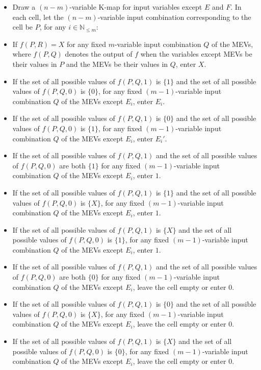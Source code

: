 \documentclass[a4paper,12pt]{article}
\begin{document}
\begin{itemize}
\begin{itemize}
\begin{itemize}
\begin{itemize}
\begin{itemize}
\begin{itemize}
\begin{itemize}
\ben
\item Draw a $(n-m)$-variable K-map for input variables except $E$ and $F$. In each cell, let the $(n-m)$-variable input combination corresponding to the cell be $P$, for any $i\in\mathbb{N}_{\leq m}$:
\bit
\item If $f(P,R)=X$ for any fixed $m$-variable input combination $Q$ of the MEVs, where $f(P,Q)$ denotes the output of $f$ when the variables except MEVs be their values in $P$ and the MEVs be their values in $Q$, enter $X$.
\item If the set of all possible values of $f(P,Q,1)$ is $\{1\}$ and the set of all possible values of $f(P,Q,0)$ is $\{0\}$, for any fixed $(m-1)$-variable input combination $Q$ of the MEVs except $E_i$, enter $E_i$.
\item If the set of all possible values of $f(P,Q,1)$ is $\{0\}$ and the set of all possible values of $f(P,Q,0)$ is $\{1\}$, for any fixed $(m-1)$-variable input combination $Q$ of the MEVs except $E_i$, enter $E_i'$.
\item If the set of all possible values of $f(P,Q,1)$ and the set of all possible values of $f(P,Q,0)$ are both $\{1\}$ for any fixed $(m-1)$-variable input combination $Q$ of the MEVs except $E_i$, enter $1$.
\item If the set of all possible values of $f(P,Q,1)$ is $\{1\}$ and the set of all possible values of $f(P,Q,0)$ is $\{X\}$, for any fixed $(m-1)$-variable input combination $Q$ of the MEVs except $E_i$, enter $1$.
\item If the set of all possible values of $f(P,Q,1)$ is $\{X\}$ and the set of all possible values of $f(P,Q,0)$ is $\{1\}$, for any fixed $(m-1)$-variable input combination $Q$ of the MEVs except $E_i$, enter $1$.
\item If the set of all possible values of $f(P,Q,1)$ and the set of all possible values of $f(P,Q,0)$ are both $\{0\}$ for any fixed $(m-1)$-variable input combination $Q$ of the MEVs except $E_i$, leave the cell empty or enter $0$.
\item If the set of all possible values of $f(P,Q,1)$ is $\{0\}$ and the set of all possible values of $f(P,Q,0)$ is $\{X\}$, for any fixed $(m-1)$-variable input combination $Q$ of the MEVs except $E_i$, leave the cell empty or enter $0$.
\item If the set of all possible values of $f(P,Q,1)$ is $\{X\}$ and the set of all possible values of $f(P,Q,0)$ is $\{0\}$, for any fixed $(m-1)$-variable input combination $Q$ of the MEVs except $E_i$, leave the cell empty or enter $0$.

\end{itemize}
\end{itemize}
\end{itemize}
\end{itemize}
\end{itemize}
\end{itemize}
\end{itemize}
\end{document}
